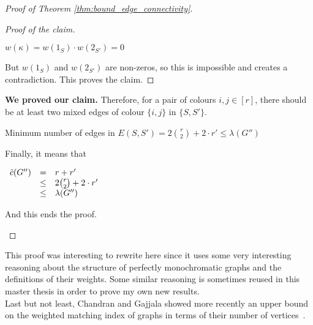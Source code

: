 \begin{proof}[Proof of Theorem \ref{thm:bound_edge_connectivity}]
\begin{enumerate}
\begin{enumerate}
\begin{proof}[Proof of the claim]
                        \begin{center}
                            $w(\kappa) = w(1_S) \cdot w(2_{S'}) = 0$
                        \end{center}
                        
                        But $w(1_S)$ and $w(2_{S'})$ are non-zeros, so this is impossible and creates a contradiction.
                        This proves the claim.
                    \end{proof}

                    \textbf{We proved our claim.}
                    Therefore, for a pair of colours $i, j \in [r]$, there should be at least two mixed edges of colour $\{i, j\}$ in $\{S, S'\}$.
                    
                    \begin{center}
                        Minimum number of edges in $E(S, S') = 2 {r \choose 2} + 2 \cdot r' \leq \lambda(G'')$
                    \end{center}
                    
                    Finally, it means that
                    
                    \begin{center}
                        $\begin{array}{lcl}
                            \Tilde{c}(G'') & =    & r + r' \\
                                           & \leq & 2 {r \choose 2} + 2 \cdot r' \\
                                           & \leq & \lambda(G'')
                        \end{array}$
                    \end{center}
                    
                    And this ends the proof.
            \end{enumerate}
    \end{enumerate}
\end{proof}

This proof was interesting to rewrite here since it uses some very interesting reasoning about the structure of perfectly monochromatic graphs and the definitions of their weights.
Some similar reasoning is sometimes reused in this master thesis in order to prove my own new results. \\

Last but not least, Chandran and Gajjala showed more recently an upper bound on the weighted matching index of graphs in terms of their number of vertices~\cite{chandran2023graphtheoretic}.

